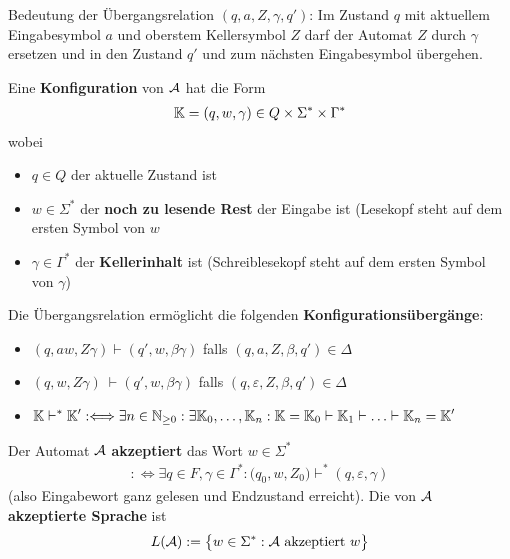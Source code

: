 Bedeutung der Übergangsrelation $(q,a,Z,\gamma,q')$:
Im Zustand $q$ mit aktuellem Eingabesymbol $a$ und oberstem Kellersymbol $Z$ darf der Automat $Z$ durch $\gamma$ ersetzen und in den Zustand $q'$ und zum nächsten Eingabesymbol übergehen.

\begin{definition}\label{def10.2}
	Eine \textbf{Konfiguration} von $\mathcal{A}$ hat die Form
	\begin{align*}
		\mathbb{K}=(q,w,\gamma)\in Q\times\Sigma^\ast\times\Gamma^\ast
	\end{align*}
	wobei
	\begin{itemize}
		\item $q\in Q$ der aktuelle Zustand ist
		\item $w\in\Sigma^\ast$ der \textbf{noch zu lesende Rest} der Eingabe ist (Lesekopf steht auf dem ersten Symbol von $w$
		\item $\gamma\in\Gamma^\ast$ der \textbf{Kellerinhalt} ist (Schreiblesekopf steht auf dem ersten Symbol von $\gamma$)
	\end{itemize}
	Die Übergangsrelation ermöglicht die folgenden \textbf{Konfigurationsübergänge}:
	\begin{itemize}
		\item $(q,aw,Z\gamma)\vdash(q',w,\beta\gamma)$ falls $(q,a,Z,\beta,q')\in\Delta$
		\item $(q,w,Z\gamma)~\vdash(q',w,\beta\gamma)$ falls $(q,\varepsilon,Z,\beta,q')\in\Delta$
		\item $\begin{aligned}
			\mathbb{K}\vdash^\ast\mathbb{K}':\Longleftrightarrow\exists n\in\mathbb{N}_{\geq0}:\exists\mathbb{K}_0,\ldots,\mathbb{K}_n:\mathbb{K}=\mathbb{K}_0\vdash\mathbb{K}_1\vdash\ldots\vdash\mathbb{K}_n=\mathbb{K}'
		\end{aligned}$
	\end{itemize}
	Der Automat $\mathcal{A}$ \textbf{akzeptiert} das Wort $w\in\Sigma^\ast$
	\begin{align*}
		:\Longleftrightarrow\exists q\in F,\gamma\in\Gamma^\ast:\big(q_0,w,Z_0\big)\vdash^\ast(q,\varepsilon,\gamma)
	\end{align*}
	(also Eingabewort ganz gelesen und Endzustand erreicht).
	Die von $\mathcal{A}$ \textbf{akzeptierte Sprache} ist
	\begin{align*}
		L(\mathcal{A}):=\big\lbrace w\in\Sigma^\ast:\mathcal{A}\text{ akzeptiert }w\big\rbrace
	\end{align*}
\end{definition}

